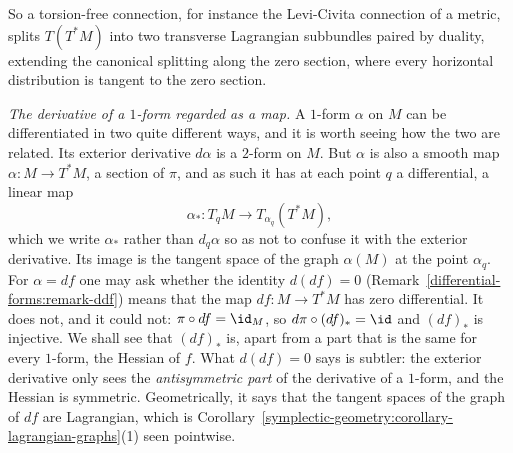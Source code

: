 So a torsion-free connection, for instance the Levi-Civita connection of a metric, splits $T(T^*M)$ into two transverse Lagrangian subbundles paired by duality, extending the canonical splitting along the
zero section, where every horizontal distribution is tangent to the zero section.

\emph{The derivative of a $1$-form regarded as a map.} A $1$-form $\alpha$ on $M$ can be differentiated in two quite different ways, and it is worth seeing how the two are related. Its
exterior derivative $d\alpha$ is a $2$-form on $M$. But $\alpha$ is also a smooth map $\alpha \colon M \to T^*M$, a section of $\pi$, and as such it has at each point $q$ a differential, a linear map
\[
\alpha_* \colon T_qM \to T_{\alpha_q}(T^*M),
\]
which we write $\alpha_*$ rather than $d_q\alpha$ so as not to confuse it with the exterior derivative. Its image is the tangent space of the graph $\alpha(M)$ at the point $\alpha_q$. For $\alpha = df$ one may
ask whether the identity $d(df) = 0$ (Remark~\ref{differential-forms:remark-ddf}) means that the map $df \colon M \to T^*M$ has zero differential. It does not, and it could not: $\pi \circ df = \id_M$, so
$d\pi \circ (df)_* = \id$ and $(df)_*$ is injective. We shall see that $(df)_*$ is, apart from a part that is the same for every $1$-form, the Hessian of $f$. What $d(df) = 0$ says is subtler: the exterior
derivative only sees the \emph{antisymmetric part} of the derivative of a $1$-form, and the Hessian is symmetric. Geometrically, it says that the tangent spaces of the graph of $df$ are Lagrangian, which is
Corollary~\ref{symplectic-geometry:corollary-lagrangian-graphs}(1) seen pointwise.


